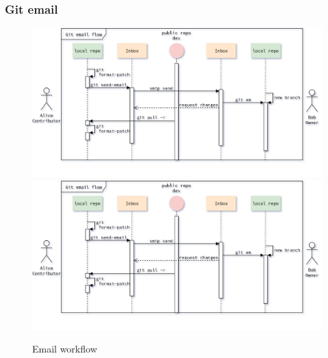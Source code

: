 \begin{frame}
    \frametitle{Git email}
    \addtocounter{page}{-1}
    \begin{figure}
        \begin{center}
            {
                \includegraphics[height=0.7\textheight,keepaspectratio]{./images/EmailWorkflow_PrepareSecoundPatch.png}
            }
            {
                \includegraphics[height=0.75\textheight,keepaspectratio]{./images/EmailWorkflow_PrepareSecoundPatch.png}
            }
            \caption{Email workflow}
        \end{center}
    \end{figure}
\end{frame}

